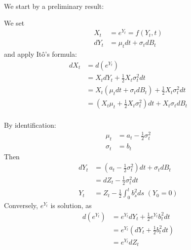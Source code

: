 We start by a preliminary result:

{
We set
\begin{align*}
    X_t &= e^{Y_t} = f(Y_t,t) \\
    dY_t &= \mu_t dt + \sigma_t dB_t
\end{align*}
and apply Itô's formula:
\begin{align*}
    dX_t &= d(e^{Y_t}) \\
    &= X_t dY_t + \frac{1}{2}X_t \sigma_t^2dt \\
    &= X_t \left( \mu_t dt + \sigma_t dB_t \right) + \frac{1}{2}X_t \sigma_t^2dt \\
    &= \left( X_t \mu_t + \frac{1}{2}X_t \sigma_t^2\right) dt + X_t \sigma_t dB_t \\
\end{align*}

By identification:
\begin{align*}
    \mu_t &= a_t - \frac{1}{2}\sigma_t^2 \\
    \sigma_t &= b_t
\end{align*}
Then
\begin{align*}
    dY_t &= \left( a_t - \frac{1}{2}\sigma_t^2\right) dt + \sigma_t dB_t \\
    &= dZ_t - \frac{1}{2}\sigma^2_t dt \\
    Y_t &= Z_t - \frac{1}{2} \int_0^t b_s^2 ds \,\, (Y_0 = 0)
\end{align*}
Conversely, $e^{Y_t}$ is solution, as
\begin{align*}
    d(e^{Y_t}) &= e^{Y_t} dY_t + \frac{1}{2}e^{Y_t} b_t^2 dt \\
    &= e^{Y_t} \left( dY_t + \frac{1}{2}b_t^2 dt\right) \\
    &= e^{Y_t} dZ_t
\end{align*}
}

